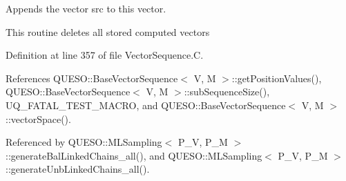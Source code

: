 Appends the vector {\ttfamily src} to {\ttfamily this} vector. 

This routine deletes all stored computed vectors 

Definition at line 357 of file Vector\-Sequence.\-C.



References Q\-U\-E\-S\-O\-::\-Base\-Vector\-Sequence$<$ V, M $>$\-::get\-Position\-Values(), Q\-U\-E\-S\-O\-::\-Base\-Vector\-Sequence$<$ V, M $>$\-::sub\-Sequence\-Size(), U\-Q\-\_\-\-F\-A\-T\-A\-L\-\_\-\-T\-E\-S\-T\-\_\-\-M\-A\-C\-R\-O, and Q\-U\-E\-S\-O\-::\-Base\-Vector\-Sequence$<$ V, M $>$\-::vector\-Space().



Referenced by Q\-U\-E\-S\-O\-::\-M\-L\-Sampling$<$ P\-\_\-\-V, P\-\_\-\-M $>$\-::generate\-Bal\-Linked\-Chains\-\_\-all(), and Q\-U\-E\-S\-O\-::\-M\-L\-Sampling$<$ P\-\_\-\-V, P\-\_\-\-M $>$\-::generate\-Unb\-Linked\-Chains\-\_\-all().



